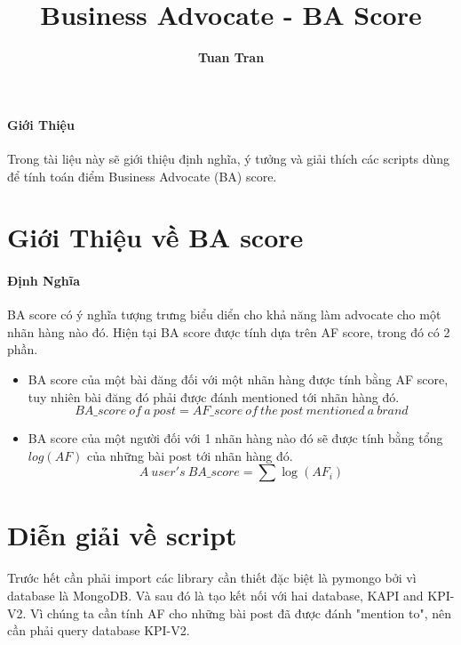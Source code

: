 \documentclass[12pt]{article}
\title{Business Advocate - BA Score}
\author{{\bf Tuan Tran}}
\numberwithin{equation}{section}
\begin{document}
\maketitle
\paragraph{Giới Thiệu} Trong tài liệu này sẽ giới thiệu định nghĩa, ý tưởng và giải thích các scripts dùng để tính toán điểm Business Advocate (BA) score.

\section{Giới Thiệu về BA score}

\paragraph{Định Nghĩa} BA score có ý nghĩa tượng trưng biểu diển cho khả năng làm advocate cho một nhãn hàng nào đó. Hiện tại BA score được tính dựa trên AF score, trong đó có 2 phần.

\begin{itemize} 

\item BA score của một bài đăng đối với một nhãn hàng được tính bằng AF score, tuy nhiên bài đăng đó phải được đánh mentioned tới nhãn hàng đó.\\
 $$BA\_score\ of\ a\ post = AF\_score\ of\ the\ post\ mentioned\ a\ brand$$
\item BA score của một người đối với 1 nhãn hàng nào đó sẽ được tính bằng tổng $log(AF)$ của những bài post tới nhãn hàng đó.\\
$$A\ user's\ BA\_score = \sum \log(AF_i) $$

\end{itemize}

\section{Diễn giải về script}

\paragraph{} Trước hết cần phải import các library cần thiết đặc biệt là pymongo bởi vì database là MongoDB. Và sau đó là tạo kết nối với hai database, KAPI and KPI-V2. Vì chúng ta cần tính AF cho những bài post đã được đánh "mention to", nên cần phải query database KPI-V2. 
\end{document}
